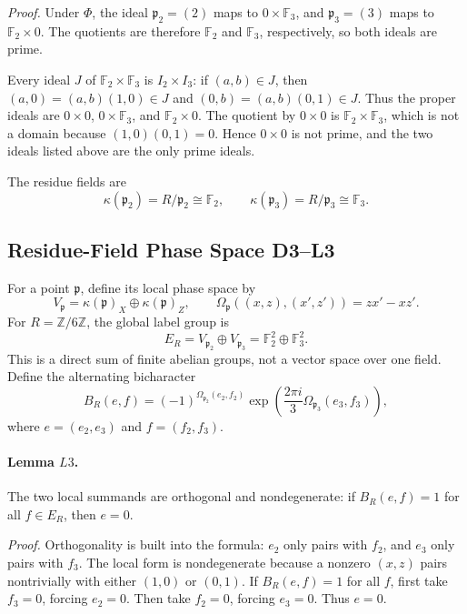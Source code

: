 \emph{Proof.}
Under \(\Phi\), the ideal \(\mathfrak p_2=(2)\) maps to
\(0\times\mathbb F_3\), and \(\mathfrak p_3=(3)\) maps to
\(\mathbb F_2\times0\).  The quotients are therefore \(\mathbb F_2\) and
\(\mathbb F_3\), respectively, so both ideals are prime.

Every ideal \(J\) of \(\mathbb F_2\times\mathbb F_3\) is \(I_2\times I_3\):
if \((a,b)\in J\), then \((a,0)=(a,b)(1,0)\in J\) and
\((0,b)=(a,b)(0,1)\in J\).  Thus the proper ideals are \(0\times0\),
\(0\times\mathbb F_3\), and \(\mathbb F_2\times0\).  The quotient by
\(0\times0\) is \(\mathbb F_2\times\mathbb F_3\), which is not a domain
because \((1,0)(0,1)=0\).  Hence \(0\times0\) is not prime, and the two ideals
listed above are the only prime ideals.

The residue fields are
\[
  \kappa(\mathfrak p_2)=R/\mathfrak p_2\cong\mathbb F_2,\qquad
  \kappa(\mathfrak p_3)=R/\mathfrak p_3\cong\mathbb F_3.
\]

\subsection{Residue-Field Phase Space D3--L3}

For a point \(\mathfrak p\), define its local phase space by
\[
  V_{\mathfrak p}=\kappa(\mathfrak p)_X\oplus\kappa(\mathfrak p)_Z,
  \qquad
  \Omega_{\mathfrak p}((x,z),(x',z'))=zx'-xz'.
\]
For \(R=\mathbb Z/6\mathbb Z\), the global label group is
\[
  E_R=V_{\mathfrak p_2}\oplus V_{\mathfrak p_3}
     =\mathbb F_2^2\oplus\mathbb F_3^2 .
\]
This is a direct sum of finite abelian groups, not a vector space over one
field.  Define the alternating bicharacter
\[
  B_R(e,f)
  =
  (-1)^{\Omega_{\mathfrak p_2}(e_2,f_2)}
  \exp\!\left(\frac{2\pi i}{3}\Omega_{\mathfrak p_3}(e_3,f_3)\right),
\]
where \(e=(e_2,e_3)\) and \(f=(f_2,f_3)\).

\paragraph{Lemma \(L3\).}
The two local summands are orthogonal and nondegenerate: if
\(B_R(e,f)=1\) for all \(f\in E_R\), then \(e=0\).

\emph{Proof.}
Orthogonality is built into the formula: \(e_2\) only pairs with \(f_2\), and
\(e_3\) only pairs with \(f_3\).  The local form is nondegenerate because a
nonzero \((x,z)\) pairs nontrivially with either \((1,0)\) or \((0,1)\).  If
\(B_R(e,f)=1\) for all \(f\), first take \(f_3=0\), forcing \(e_2=0\).  Then
take \(f_2=0\), forcing \(e_3=0\).  Thus \(e=0\).

